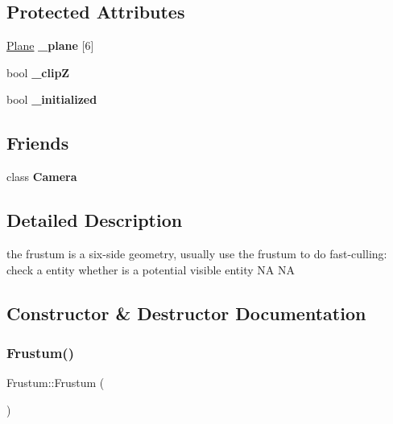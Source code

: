 \subsection*{Protected Attributes}
\begin{DoxyCompactItemize}
\item 
\mbox{\label{classFrustum_a0d29ca2df862ce9c8f848278540fb1a4}} 
\hyperlink{classPlane}{Plane} {\bfseries \+\_\+plane} \mbox{[}6\mbox{]}
\item 
\mbox{\label{classFrustum_a0c1cde87984a42f04cfd77a667ff5226}} 
bool {\bfseries \+\_\+clipZ}
\item 
\mbox{\label{classFrustum_ac210ea665f1beb2f067bd762746ace94}} 
bool {\bfseries \+\_\+initialized}
\end{DoxyCompactItemize}
\subsection*{Friends}
\begin{DoxyCompactItemize}
\item 
\mbox{\label{classFrustum_adc0591c2c6aa3aa864336ece4978ab62}} 
class {\bfseries Camera}
\end{DoxyCompactItemize}


\subsection{Detailed Description}
the frustum is a six-\/side geometry, usually use the frustum to do fast-\/culling\+: check a entity whether is a potential visible entity  NA  NA 

\subsection{Constructor \& Destructor Documentation}
\mbox{\label{classFrustum_a172ae3492592e3ac891642299d628494}} 
\subsubsection{\texorpdfstring{Frustum()}{Frustum()}\hspace{0.1cm}{\footnotesize\ttfamily [1/2]}}
{\footnotesize\ttfamily Frustum\+::\+Frustum (\begin{DoxyParamCaption}{ }\end{DoxyParamCaption})\hspace{0.3cm}{\ttfamily [inline]}}

